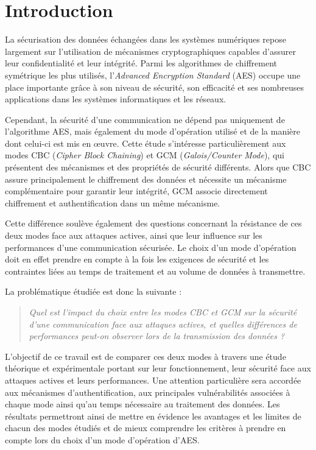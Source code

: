\documentclass[12pt,a4paper]{article}
\begin{document}
\newpage

\tableofcontents

\newpage

\section{Introduction}

La sécurisation des données échangées dans les systèmes numériques repose largement sur l'utilisation de mécanismes cryptographiques capables d'assurer leur confidentialité et leur intégrité. Parmi les algorithmes de chiffrement symétrique les plus utilisés, l'\textit{Advanced Encryption Standard} (AES) occupe une place importante grâce à son niveau de sécurité, son efficacité et ses nombreuses applications dans les systèmes informatiques et les réseaux.

Cependant, la sécurité d'une communication ne dépend pas uniquement de l'algorithme AES, mais également du mode d'opération utilisé et de la manière dont celui-ci est mis en œuvre. Cette étude s'intéresse particulièrement aux modes CBC (\textit{Cipher Block Chaining}) et GCM (\textit{Galois/Counter Mode}), qui présentent des mécanismes et des propriétés de sécurité différents. Alors que CBC assure principalement le chiffrement des données et nécessite un mécanisme complémentaire pour garantir leur intégrité, GCM associe directement chiffrement et authentification dans un même mécanisme.

Cette différence soulève également des questions concernant la résistance de ces deux modes face aux attaques actives, ainsi que leur influence sur les performances d'une communication sécurisée. Le choix d'un mode d'opération doit en effet prendre en compte à la fois les exigences de sécurité et les contraintes liées au temps de traitement et au volume de données à transmettre.

La problématique étudiée est donc la suivante :

\begin{quote}
\textit{Quel est l'impact du choix entre les modes CBC et GCM sur la sécurité d'une communication face aux attaques actives, et quelles différences de performances peut-on observer lors de la transmission des données ?}
\end{quote}

L'objectif de ce travail est de comparer ces deux modes à travers une étude théorique et expérimentale portant sur leur fonctionnement, leur sécurité face aux attaques actives et leurs performances. Une attention particulière sera accordée aux mécanismes d'authentification, aux principales vulnérabilités associées à chaque mode ainsi qu'au temps nécessaire au traitement des données. Les résultats permettront ainsi de mettre en évidence les avantages et les limites de chacun des modes étudiés et de mieux comprendre les critères à prendre en compte lors du choix d'un mode d'opération d'AES.
\end{document}
